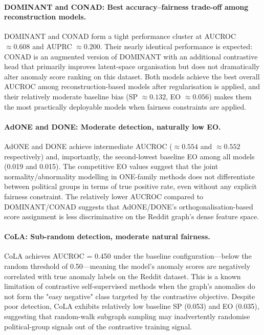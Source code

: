 \documentclass[sigconf,natbib=false]{acmart}
\begin{document}
\paragraph{DOMINANT and CONAD: Best accuracy–fairness trade-off among reconstruction models.}
DOMINANT and CONAD form a tight performance cluster at AUCROC $\approx 0.608$ and AUPRC $\approx 0.200$. Their nearly identical performance is expected: CONAD is an augmented version of DOMINANT with an additional contrastive head that primarily improves latent-space organisation but does not dramatically alter anomaly score ranking on this dataset. Both models achieve the best overall AUCROC among reconstruction-based models after regularisation is applied, and their relatively moderate baseline bias (SP $\approx 0.132$, EO $\approx 0.056$) makes them the most practically deployable models when fairness constraints are applied.

\paragraph{AdONE and DONE: Moderate detection, naturally low EO.}
AdONE and DONE achieve intermediate AUCROC ($\approx 0.554$ and $\approx 0.552$ respectively) and, importantly, the second-lowest baseline EO among all models (0.019 and 0.015). The competitive EO values suggest that the joint normality/abnormality modelling in ONE-family methods does not differentiate between political groups in terms of true positive rate, even without any explicit fairness constraint. The relatively lower AUCROC compared to DOMINANT/CONAD suggests that AdONE/DONE's orthogonalisation-based score assignment is less discriminative on the Reddit graph's dense feature space.

\paragraph{CoLA: Sub-random detection, moderate natural fairness.}
CoLA achieves AUCROC = 0.450 under the baseline configuration—below the random threshold of 0.50—meaning the model's anomaly scores are negatively correlated with true anomaly labels on the Reddit dataset. This is a known limitation of contrastive self-supervised methods when the graph's anomalies do not form the "easy negative" class targeted by the contrastive objective. Despite poor detection, CoLA exhibits relatively low baseline SP (0.053) and EO (0.035), suggesting that random-walk subgraph sampling may inadvertently randomise political-group signals out of the contrastive training signal.
\end{document}
